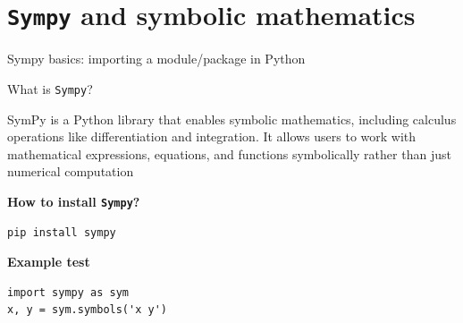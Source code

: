 \documentclass[10pt]{beamer}
\newcommand{\gd}[2]{\begin{debox}[label=#1]#2\end{debox}}
\begin{document}
\section{\textbf{\texttt{Sympy} and symbolic mathematics}}

\begin{frame}[fragile]{Sympy basics: importing a module/package in Python}
\begin{block} {What is \texttt{Sympy}?}
\vspace*{0.1cm}
\gd{impliciteintersection}{
SymPy is a Python library that enables symbolic mathematics, including calculus operations like differentiation and integration. It allows users to work with mathematical expressions, equations, and functions symbolically rather than just numerical computation}
\end{block}

\begin{block}{\textbf{How to install \texttt{Sympy}?}}
\vspace{0.2cm}
\begin{lstlisting}[style=mypython]
pip install sympy 
\end{lstlisting}
\end{block}

\begin{block}{\textbf{Example test}}
\vspace{0.2cm}
\begin{lstlisting}[style=mypython]
import sympy as sym
x, y = sym.symbols('x y')
\end{lstlisting}
\end{block}

\end{frame}
\end{document}

